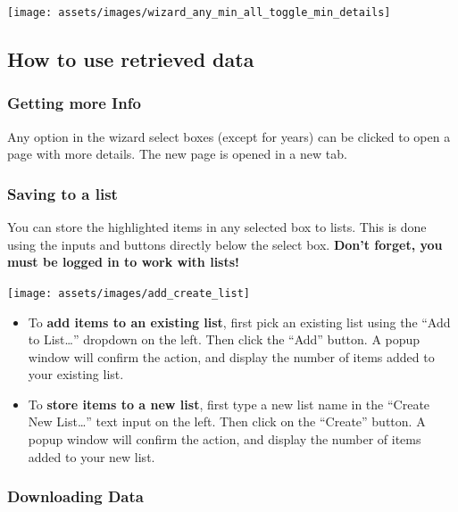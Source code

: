 \documentclass[
  12pt,
]{book}
\begin{document}
\begin{center}\texttt{[image: assets/images/wizard\_any\_min\_all\_toggle\_min\_details]} \end{center}

\hypertarget{how-to-use-retrieved-data}{%
\subsection{How to use retrieved data}\label{how-to-use-retrieved-data}}

\hypertarget{getting-more-info}{%
\subsubsection*{Getting more Info}\label{getting-more-info}}


Any option in the wizard select boxes (except for years) can be clicked to open a page with more details. The new page is opened in a new tab.

\hypertarget{saving-to-a-list}{%
\subsubsection*{Saving to a list}\label{saving-to-a-list}}


You can store the highlighted items in any selected box to lists. This is done using the inputs and buttons directly below the select box. \textbf{Don't forget, you must be logged in to work with lists!}

\begin{center}\texttt{[image: assets/images/add\_create\_list]} \end{center}

\begin{itemize}
\item
  To \textbf{add items to an existing list}, first pick an existing list using the ``Add to List\ldots{}'' dropdown on the left. Then click the ``Add'' button. A popup window will confirm the action, and display the number of items added to your existing list.
\item
  To \textbf{store items to a new list}, first type a new list name in the ``Create New List\ldots{}'' text input on the left. Then click on the ``Create'' button. A popup window will confirm the action, and display the number of items added to your new list.
\end{itemize}

\hypertarget{downloading-data}{%
\subsubsection*{Downloading Data}\label{downloading-data}}
\end{document}
